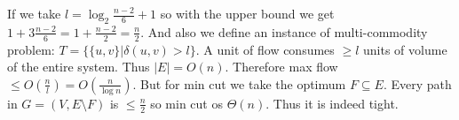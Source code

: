 If we take $l = \log_{2} \frac{n-2}{6} + 1$ so with the upper bound we get $1 + 3\frac{n-2}{6} = 1 + \frac{n-2}{2} = \frac{n}{2}$. And also we define an instance of multi-commodity problem: $T = \{\{u,v\} | \delta(u,v) > l\}$. A unit of flow consumes $\geq l$ units of volume of the entire system. Thus $|E| = O(n)$. Therefore max flow $\leq O(\frac{n}{l}) = O(\frac{n}{\log n})$. But for min cut we take the optimum $F \subseteq E$. Every path in $G = (V, E \setminus F)$ is $\leq \frac{n}{2}$ so min cut os $\Theta(n)$. Thus it is indeed tight.